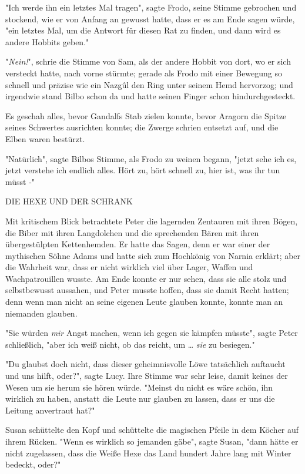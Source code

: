 {"Ich werde ihn ein letztes Mal tragen", sagte Frodo, seine Stimme gebrochen und stockend, wie er von Anfang an gewusst hatte, dass er es am Ende sagen würde, "ein letztes Mal, um die Antwort für diesen Rat zu finden, und dann wird es andere Hobbits geben."

"\emph{Nein!}", schrie die Stimme von Sam, als der andere Hobbit von dort, wo er sich versteckt hatte, nach vorne stürmte; gerade als Frodo mit einer Bewegung so schnell und präzise wie ein Nazgûl den Ring unter seinem Hemd hervorzog; und irgendwie stand Bilbo schon da und hatte seinen Finger schon hindurchgesteckt.

Es geschah alles, bevor Gandalfs Stab zielen konnte, bevor Aragorn die Spitze seines Schwertes ausrichten konnte; die Zwerge schrien entsetzt auf, und die Elben waren bestürzt.

"Natürlich", sagte Bilbos Stimme, als Frodo zu weinen begann, "jetzt sehe ich es, jetzt verstehe ich endlich alles. Hört zu, hört schnell zu, hier ist, was ihr tun müsst -"

DIE HEXE UND DER SCHRANK

Mit kritischem Blick betrachtete Peter die lagernden Zentauren mit ihren Bögen, die Biber mit ihren Langdolchen und die sprechenden Bären mit ihren übergestülpten Kettenhemden. Er hatte das Sagen, denn er war einer der mythischen Söhne Adams und hatte sich zum Hochkönig von Narnia erklärt; aber die Wahrheit war, dass er nicht wirklich viel über Lager, Waffen und Wachpatrouillen wusste. Am Ende konnte er nur sehen, dass sie alle stolz und selbstbewusst aussahen, und Peter musste hoffen, dass sie damit Recht hatten; denn wenn man nicht an seine eigenen Leute glauben konnte, konnte man an niemanden glauben.

"Sie würden \emph{mir} Angst machen, wenn ich gegen sie kämpfen müsste", sagte Peter schließlich, "aber ich weiß nicht, ob das reicht, um … \emph{sie} zu besiegen."

"Du glaubst doch nicht, dass dieser geheimnisvolle Löwe tatsächlich auftaucht und uns hilft, oder?", sagte Lucy. Ihre Stimme war sehr leise, damit keines der Wesen um sie herum sie hören würde. "Meinst du nicht es wäre schön, ihn wirklich zu haben, anstatt die Leute nur glauben zu lassen, dass er uns die Leitung anvertraut hat?"

Susan schüttelte den Kopf und schüttelte die magischen Pfeile in dem Köcher auf ihrem Rücken. "Wenn es wirklich so jemanden gäbe", sagte Susan, "dann hätte er nicht zugelassen, dass die Weiße Hexe das Land hundert Jahre lang mit Winter bedeckt, oder?"

}
